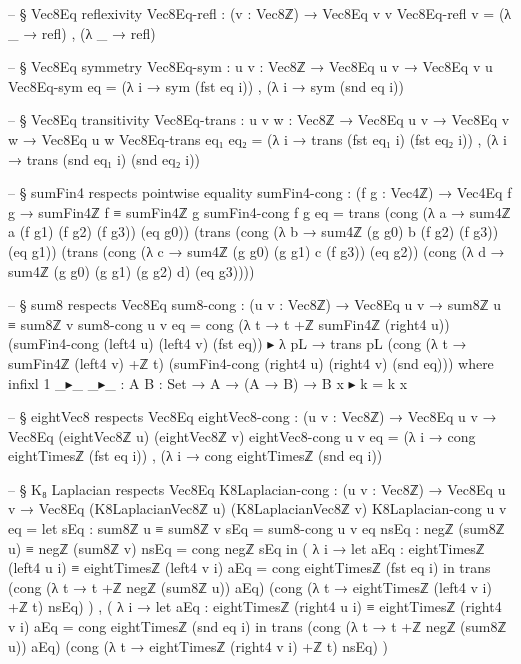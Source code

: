 \documentclass[11pt,a4paper]{book}
\begin{document}
\begin{code}
-- § Vec8Eq reflexivity
Vec8Eq-refl : (v : Vec8ℤ) → Vec8Eq v v
Vec8Eq-refl v = (λ _ → refl) , (λ _ → refl)

-- § Vec8Eq symmetry
Vec8Eq-sym : {u v : Vec8ℤ} → Vec8Eq u v → Vec8Eq v u
Vec8Eq-sym eq =
  (λ i → sym (fst eq i)) ,
  (λ i → sym (snd eq i))

-- § Vec8Eq transitivity
Vec8Eq-trans : {u v w : Vec8ℤ} → Vec8Eq u v → Vec8Eq v w → Vec8Eq u w
Vec8Eq-trans eq₁ eq₂ =
  (λ i → trans (fst eq₁ i) (fst eq₂ i)) ,
  (λ i → trans (snd eq₁ i) (snd eq₂ i))

-- § sumFin4 respects pointwise equality
sumFin4-cong : (f g : Vec4ℤ) → Vec4Eq f g → sumFin4ℤ f ≡ sumFin4ℤ g
sumFin4-cong f g eq =
  trans
    (cong (λ a → sum4ℤ a (f g1) (f g2) (f g3)) (eq g0))
    (trans
      (cong (λ b → sum4ℤ (g g0) b (f g2) (f g3)) (eq g1))
      (trans
        (cong (λ c → sum4ℤ (g g0) (g g1) c (f g3)) (eq g2))
        (cong (λ d → sum4ℤ (g g0) (g g1) (g g2) d) (eq g3))))

-- § sum8 respects Vec8Eq
sum8-cong : (u v : Vec8ℤ) → Vec8Eq u v → sum8ℤ u ≡ sum8ℤ v
sum8-cong u v eq =
  cong (λ t → t +ℤ sumFin4ℤ (right4 u)) (sumFin4-cong (left4 u) (left4 v) (fst eq))
  ▸ λ pL →
  trans pL
    (cong (λ t → sumFin4ℤ (left4 v) +ℤ t) (sumFin4-cong (right4 u) (right4 v) (snd eq)))
  where
    infixl 1 _▸_
    _▸_ : {A B : Set} → A → (A → B) → B
    x ▸ k = k x

-- § eightVec8 respects Vec8Eq
eightVec8-cong : (u v : Vec8ℤ) → Vec8Eq u v → Vec8Eq (eightVec8ℤ u) (eightVec8ℤ v)
eightVec8-cong u v eq =
  (λ i → cong eightTimesℤ (fst eq i)) ,
  (λ i → cong eightTimesℤ (snd eq i))

-- § K₈ Laplacian respects Vec8Eq
K8Laplacian-cong : (u v : Vec8ℤ) → Vec8Eq u v → Vec8Eq (K8LaplacianVec8ℤ u) (K8LaplacianVec8ℤ v)
K8Laplacian-cong u v eq =
  let sEq : sum8ℤ u ≡ sum8ℤ v
      sEq = sum8-cong u v eq
      nsEq : negℤ (sum8ℤ u) ≡ negℤ (sum8ℤ v)
      nsEq = cong negℤ sEq
  in
  ( λ i →
      let aEq : eightTimesℤ (left4 u i) ≡ eightTimesℤ (left4 v i)
          aEq = cong eightTimesℤ (fst eq i)
      in
      trans
        (cong (λ t → t +ℤ negℤ (sum8ℤ u)) aEq)
        (cong (λ t → eightTimesℤ (left4 v i) +ℤ t) nsEq)
  ) ,
  ( λ i →
      let aEq : eightTimesℤ (right4 u i) ≡ eightTimesℤ (right4 v i)
          aEq = cong eightTimesℤ (snd eq i)
      in
      trans
        (cong (λ t → t +ℤ negℤ (sum8ℤ u)) aEq)
        (cong (λ t → eightTimesℤ (right4 v i) +ℤ t) nsEq)
  )
\end{code}
\end{document}
